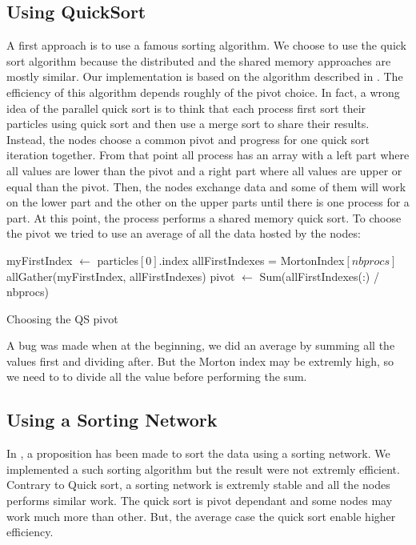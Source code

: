 \documentclass[12pt,letterpaper,titlepage]{report}
\begin{document}
\subsection{Using QuickSort}
A first approach is to use a famous sorting algorithm.  We choose to
use the quick sort algorithm because the distributed and the shared
memory approaches are mostly similar.  Our implementation is based on
the algorithm described in \cite{itpc03}.  The efficiency of this
algorithm depends roughly of the pivot choice.  In fact, a wrong idea
of the parallel quick sort is to think that each process first sort
their particles using quick sort and then use a merge sort to share
their results.  Instead, the nodes choose a common pivot and progress
for one quick sort iteration together.  From that point all process
has an array with a left part where all values are lower than the
pivot and a right part where all values are upper or equal than the
pivot.  Then, the nodes exchange data and some of them will work on
the lower part and the other on the upper parts until there is one
process for a part.  At this point, the process performs a shared
memory quick sort.  To choose the pivot we tried to use an average of
all the data hosted by the nodes:
\newline
\begin{algorithm}[H]
  \LinesNumbered
  \SetAlgoLined
  \BlankLine
  myFirstIndex $\leftarrow$ particles$[0]$.index\;
  allFirstIndexes = MortonIndex$[nbprocs]$\;
  allGather(myFirstIndex, allFirstIndexes)\;
  pivot $\leftarrow$ Sum(allFirstIndexes(:) / nbprocs)\;
  \BlankLine
  \caption{Choosing the QS pivot}
\end{algorithm}

A bug was made when at the beginning, we did an average by summing all
the values first and dividing after. But the Morton index may be
extremly high, so we need to to divide all the value before performing
the sum.

\subsection{Using a Sorting Network}
In \cite{ptttplwaefmm11}, a proposition has been made to sort the data using a sorting network.
We implemented a such sorting algorithm but the result were not extremly efficient.
Contrary to Quick sort, a sorting network is extremly stable and all the nodes performs similar work.
The quick sort is pivot dependant and some nodes may work much more than other.
But, the average case the quick sort enable higher efficiency.
\end{document}
